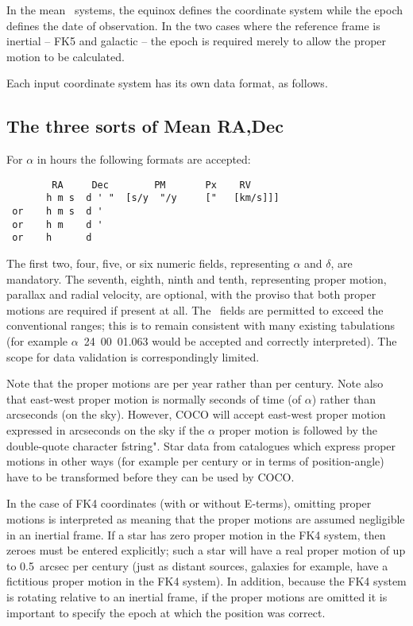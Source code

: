 In the mean \radec\ systems, the equinox defines the coordinate
system while the epoch defines the date of observation.
In the two cases where the reference frame is inertial -- FK5
and galactic -- the epoch is required merely to allow the proper
motion to be calculated.

Each input coordinate system has its own data format, as follows.

\subsection{The three sorts of Mean RA,Dec}

For $\alpha$ in hours the following formats are accepted:
\begin{verbatim}
        RA     Dec        PM       Px    RV
       h m s  d ' "  [s/y  "/y     ["   [km/s]]]
 or    h m s  d '
 or    h m    d '
 or    h      d
\end{verbatim}

The first two, four, five, or six numeric fields, representing
$\alpha$ and $\delta$,
are mandatory. The seventh, eighth, ninth and tenth, representing proper motion,
parallax and radial velocity, are optional, with the proviso
that both proper motions are required if present at all.
The \radec\ fields are permitted to exceed the conventional ranges; this is
to remain consistent with many existing tabulations (for example
$\alpha$~24~00~01.063 would be accepted and correctly interpreted).
The scope for data validation is correspondingly limited.

Note that the proper motions are per year rather than per century.
Note also that east-west proper motion is normally seconds of time
(of $\alpha$) rather than arcseconds (on the sky).  However, COCO will
accept east-west proper motion expressed in arcseconds on the sky
if the $\alpha$ proper motion is followed by the double-quote
character fstring{"}.
Star data from catalogues which express proper motions
in other ways (for example per century or in terms of position-angle)
have to be transformed before they can be used by COCO.

In the case of FK4 coordinates (with or without E-terms), omitting
proper motions is interpreted as meaning that the proper motions
are assumed negligible in an inertial frame.
If a star has zero proper motion in the FK4 system, then zeroes must
be entered explicitly; such a star will have a real proper motion of
up to 0.5~arcsec per century (just as distant sources, galaxies
for example, have a fictitious proper motion in the FK4 system).
In addition, because the FK4 system is rotating relative to an
inertial frame, if the proper motions are omitted it is important to
specify the epoch at which the position was correct.

